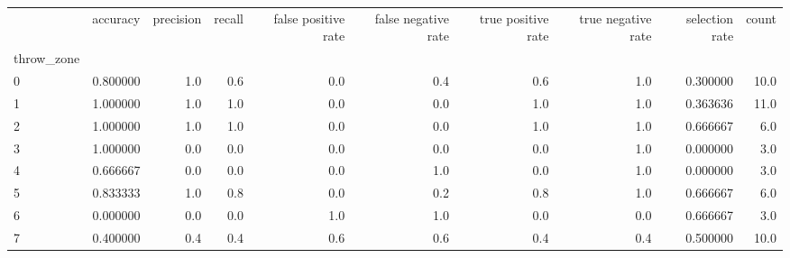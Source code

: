 \begin{tabular}{lrrrrrrrrr}
\toprule
{} &  accuracy &  precision &  recall &  false positive rate &  false negative rate &  true positive rate &  true negative rate &  selection rate &  count \\
throw\_zone &           &            &         &                      &                      &                     &                     &                 &        \\
\midrule
0          &  0.800000 &        1.0 &     0.6 &                  0.0 &                  0.4 &                 0.6 &                 1.0 &        0.300000 &   10.0 \\
1          &  1.000000 &        1.0 &     1.0 &                  0.0 &                  0.0 &                 1.0 &                 1.0 &        0.363636 &   11.0 \\
2          &  1.000000 &        1.0 &     1.0 &                  0.0 &                  0.0 &                 1.0 &                 1.0 &        0.666667 &    6.0 \\
3          &  1.000000 &        0.0 &     0.0 &                  0.0 &                  0.0 &                 0.0 &                 1.0 &        0.000000 &    3.0 \\
4          &  0.666667 &        0.0 &     0.0 &                  0.0 &                  1.0 &                 0.0 &                 1.0 &        0.000000 &    3.0 \\
5          &  0.833333 &        1.0 &     0.8 &                  0.0 &                  0.2 &                 0.8 &                 1.0 &        0.666667 &    6.0 \\
6          &  0.000000 &        0.0 &     0.0 &                  1.0 &                  1.0 &                 0.0 &                 0.0 &        0.666667 &    3.0 \\
7          &  0.400000 &        0.4 &     0.4 &                  0.6 &                  0.6 &                 0.4 &                 0.4 &        0.500000 &   10.0 \\
\bottomrule
\end{tabular}
